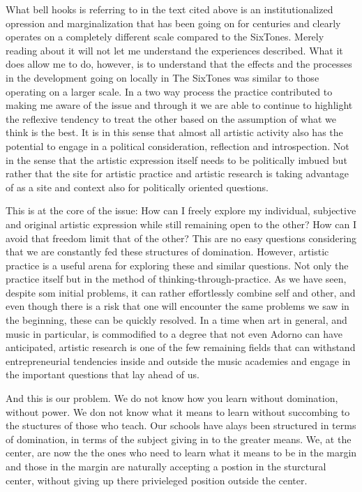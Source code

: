 \documentclass[a4paper]{article}
\begin{document}
What bell hooks is referring to in the text cited above is an institutionalized opression and marginalization that has been going on for centuries and clearly operates on a completely different scale compared to the SixTones. Merely reading about it will not let me understand the experiences described. What it does allow me to do, however, is to understand that the effects and the processes in the development going on locally in The SixTones was similar to those operating on a larger scale. In a two way process the practice contributed to making me aware of the issue and through it we are able to continue to highlight the reflexive tendency to treat the other based on the assumption of what we think is the best. It is in this sense that almost all artistic activity also has the potential to engage in a political consideration, reflection and introspection. Not in the sense that the artistic expression itself needs to be politically imbued but rather that the site for artistic practice and artistic research is taking advantage of as a site and context also for politically oriented questions. 

This is at the core of the issue: How can I freely explore my individual, subjective and original artistic expression while still remaining open to the other? How can I avoid that freedom limit that of the other? This are no easy questions considering that we are constantly fed these structures of domination. However, artistic practice is a useful arena for exploring these and similar questions. Not only the practice itself but in the method of thinking-through-practice. As we have seen, despite som initial problems, it can rather effortlessly combine self and other, and even though there is a risk that one will encounter the same problems we saw in the beginning, these can be quickly resolved. In a time when art in general, and music in particular, is commodified to a degree that not even Adorno can have anticipated, artistic research is one of the few remaining fields that can withstand entrepreneurial tendencies inside and outside the music academies and engage in the important questions that lay ahead of us. 

And this is our problem. We do not know how you learn without domination, without power. We don not know what it means to learn without succombing to the stuctures of those who teach. Our schools have alays been structured in terms of domination, in terms of the subject giving in to the greater means. We, at the center, are now the the ones who need to learn what it means to be in the margin and those in the margin are naturally accepting a postion in the sturctural center, without giving up there privieleged position outside the center. 
\end{document}
